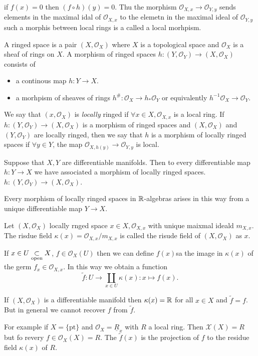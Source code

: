 \begin{note}
	if $f(x) = 0$  then $(f\circ h)(y) = 0$. Thu the morphism $\mathcal{O} _{X, x} \to \mathcal{O} _{Y, y}$ sends elements in the maximal idal of $\mathcal{O} _{X,x} $ to the elemetn in the maximal ideal of $\mathcal{O} _{Y, y}$ such a morphis between local rings is a called a local morhpism.
\end{note}
\begin{definition}
	A ringed space is a pair $(X, \mathcal{O} _X)$ where $X$ is a topological space and  $\mathcal{O} _X$ is a sheaf of rings on $X$. A morphism of ringed spaces $h: (Y, \mathcal{O} _Y) \to (X, \mathcal{O}_X)$ consists of 
	\begin{itemize}
		\item  a continous map $h: Y \to X $. 
		\item a morhpism of sheaves of rings $h^{\#}: \mathcal{O} _X \to h_* \mathcal{O} _Y$ or equivalently $h^{-1} \mathcal{O} _X \to \mathcal{O} _Y$. 
	\end{itemize}
	
	We say that $(x, \mathcal{O} _X)$ is \emph{locally} ringed if $\forall x \in X,  \mathcal{O} _{X,x}$ is a local ring. 
	If $h : (Y, \mathcal{O} _Y) \to (X, \mathcal{O} _X)$ is a morphism of ringed spaces and $(X, \mathcal{O} _X)$ and $(Y, \mathcal{O} _Y)$ are locally ringed, then we say that $h$ is a morphism of locally ringed spaces if $\forall y \in Y$, the map $\mathcal{O}_{X, h(y)} \to \mathcal{O} _{Y, y} $ is local.
\end{definition}
\begin{example}
	[or exercise]
	Suppose that $X, Y$ are differentiable manifolds. Then to every differentiable map  $h: Y \to X$ we have associated a morphism of locally ringed spaces.
	$h: (Y , \mathcal{O} _Y) \to (X, \mathcal{O} _X)$. 
	
	Every morphism of locally ringed spaces in $\mathbb{R}$-algebras arises in this way from a unique differentiable map $Y \to X$. 
\end{example}
Let $(X, \mathcal{O} _X)$ locally rnged space $x \in X, \mathcal{O} _{X, x} $  with unique maixmal ideald $m_{X, x}$. 
The risdue field  $\kappa(x) = \mathcal{O} _{X, x} / m_{X,x}$ is called the risude field of $(X, \mathcal{O} _X)$ as $x$.

If $x \in U \underset{\text{open}}{\subset} X $, $f \in \mathcal{O} _X(U)$ then we can define $f(x)$sa the image in $\kappa(x)$ of the germ $f_x \in \mathcal{O}_{X, x}$. In this way we obtain a function \[
	\tilde f : U \to \coprod_{x \in U}\kappa(x):x\mapsto f(x)
.\] 
\begin{example}
	If $(X, \mathcal{O}_X) $ is a differentiable manifold then $\kappa (x) = \mathbb{R}$ for all $x \in X$ and $\tilde f  = f$. 
	But in general we cannot recover $f $ from $\tilde f$. 

	For example if  $X = \{\text{pt}\} $ and $\mathcal{O} _{X} = \underline R_x$ with $R$ a local ring. 
	Then $\mathcal{X} (X) = R$ but fo revery $f \in \mathcal{O}_X (X) = R$. The $\tilde f(x)$ is the projection of $f$ to the residue field $\kappa(x) $ of $R$.
\end{example}

